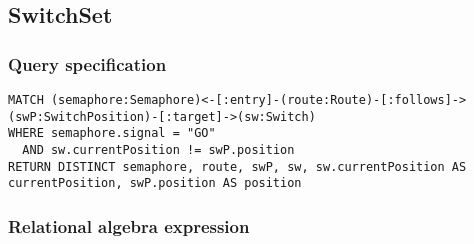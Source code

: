 \subsection{SwitchSet}

\subsubsection*{Query specification}

\begin{lstlisting}
MATCH (semaphore:Semaphore)<-[:entry]-(route:Route)-[:follows]->(swP:SwitchPosition)-[:target]->(sw:Switch)
WHERE semaphore.signal = "GO"
  AND sw.currentPosition != swP.position
RETURN DISTINCT semaphore, route, swP, sw, sw.currentPosition AS currentPosition, swP.position AS position
\end{lstlisting}

\subsubsection*{Relational algebra expression}

